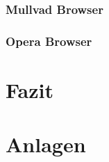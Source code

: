 \documentclass[12pt]{article}
\begin{document}
 \subsubsection{Mullvad Browser}
\subsubsection{Opera Browser}




 \section{Fazit}


\newpage
 \listoffigures
\newpage



\newpage

\centering
\vspace*{200pt}
\Huge{\section{Anlagen}}
\end{document}
